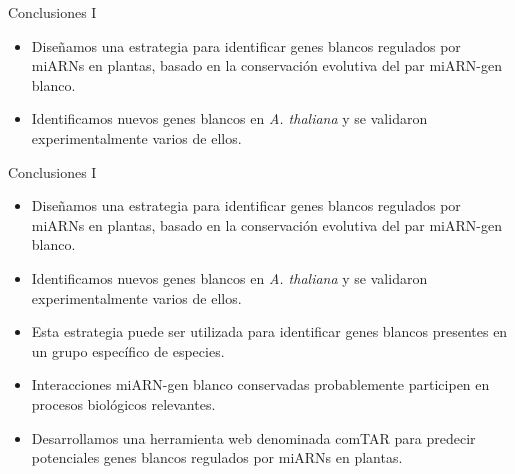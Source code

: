 \documentclass{beamer}
\begin{document}
\begin{frame}{Conclusiones I}
	\begin{itemize}
        \item<1-> Diseñamos una estrategia para identificar genes blancos regulados por miARNs en plantas, basado en la conservación evolutiva del par miARN-gen blanco.
        \item<2-> Identificamos nuevos genes blancos en \textit{A. thaliana} y se validaron experimentalmente varios de ellos.
	\end{itemize}
\end{frame}


\begin{frame}{Conclusiones I}
	\begin{itemize}
        \item<1-> Diseñamos una estrategia para identificar genes blancos regulados por miARNs en plantas, basado en la conservación evolutiva del par miARN-gen blanco.
        \item<1-> Identificamos nuevos genes blancos en \textit{A. thaliana} y se validaron experimentalmente varios de ellos.
        \item<1-> Esta estrategia puede ser utilizada para identificar genes blancos presentes en un grupo específico de especies.
        \item<2-> Interacciones miARN-gen blanco conservadas probablemente participen en procesos biológicos relevantes.
        \item<3-> Desarrollamos una herramienta web denominada comTAR para predecir potenciales genes blancos regulados por miARNs en plantas.
	\end{itemize}
\end{frame}
\end{document}
